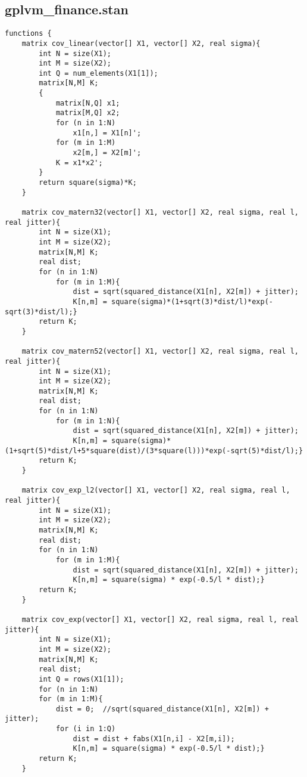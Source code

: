 \subsection{gplvm\_finance.stan}
\lstset{basicstyle=\tiny, style=Stan}
\begin{lstlisting}
functions {
	matrix cov_linear(vector[] X1, vector[] X2, real sigma){
		int N = size(X1);
		int M = size(X2);
		int Q = num_elements(X1[1]);
		matrix[N,M] K;
		{
			matrix[N,Q] x1;
			matrix[M,Q] x2;
			for (n in 1:N)
				x1[n,] = X1[n]';
			for (m in 1:M)
				x2[m,] = X2[m]';
			K = x1*x2';
		}
		return square(sigma)*K;
	}
	
	matrix cov_matern32(vector[] X1, vector[] X2, real sigma, real l, real jitter){
		int N = size(X1);
		int M = size(X2);
		matrix[N,M] K;
		real dist;
		for (n in 1:N)
			for (m in 1:M){
				dist = sqrt(squared_distance(X1[n], X2[m]) + jitter);
				K[n,m] = square(sigma)*(1+sqrt(3)*dist/l)*exp(-sqrt(3)*dist/l);}
		return K;
	}
	
	matrix cov_matern52(vector[] X1, vector[] X2, real sigma, real l, real jitter){
		int N = size(X1);
		int M = size(X2);
		matrix[N,M] K;
		real dist;
		for (n in 1:N)
			for (m in 1:N){
				dist = sqrt(squared_distance(X1[n], X2[m]) + jitter);
				K[n,m] = square(sigma)*(1+sqrt(5)*dist/l+5*square(dist)/(3*square(l)))*exp(-sqrt(5)*dist/l);}
		return K;
	}
	
	matrix cov_exp_l2(vector[] X1, vector[] X2, real sigma, real l, real jitter){
		int N = size(X1);
		int M = size(X2);
		matrix[N,M] K;
		real dist;
		for (n in 1:N)
			for (m in 1:M){
				dist = sqrt(squared_distance(X1[n], X2[m]) + jitter);
				K[n,m] = square(sigma) * exp(-0.5/l * dist);}
		return K;
	}
	
	matrix cov_exp(vector[] X1, vector[] X2, real sigma, real l, real jitter){
		int N = size(X1);
		int M = size(X2);
		matrix[N,M] K;
		real dist;
		int Q = rows(X1[1]);
		for (n in 1:N)
		for (m in 1:M){
			dist = 0;  //sqrt(squared_distance(X1[n], X2[m]) + jitter);
			for (i in 1:Q)
				dist = dist + fabs(X1[n,i] - X2[m,i]);
				K[n,m] = square(sigma) * exp(-0.5/l * dist);}
		return K;
	}
	

\end{lstlisting}
